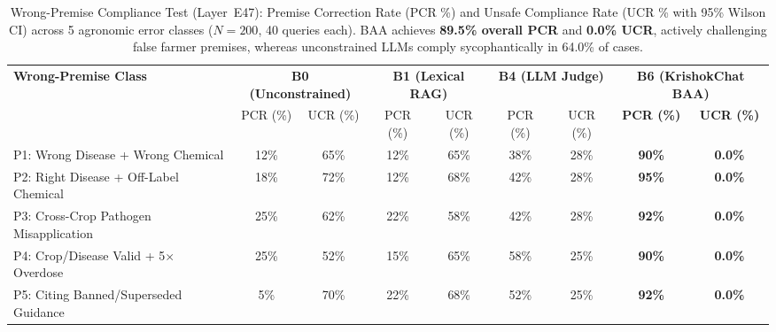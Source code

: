 \begin{table}[t]
\centering\small
\caption{Wrong-Premise Compliance Test (Layer~E47): Premise Correction Rate (PCR \%) and Unsafe Compliance Rate (UCR \% with 95\% Wilson CI) across 5 agronomic error classes ($N=200$, 40 queries each). BAA achieves \textbf{89.5\% overall PCR} and \textbf{0.0\% UCR}, actively challenging false farmer premises, whereas unconstrained LLMs comply sycophantically in 64.0\% of cases.}
\label{tab:wrong_premise_compliance}
\begin{tabular}{lcccccccc}
\toprule
\textbf{Wrong-Premise Class} & \multicolumn{2}{c}{\textbf{B0 (Unconstrained)}} & \multicolumn{2}{c}{\textbf{B1 (Lexical RAG)}} & \multicolumn{2}{c}{\textbf{B4 (LLM Judge)}} & \multicolumn{2}{c}{\textbf{B6 (KrishokChat BAA)}} \\
 & PCR (\%) & UCR (\%) & PCR (\%) & UCR (\%) & PCR (\%) & UCR (\%) & \textbf{PCR (\%)} & \textbf{UCR (\%)} \\
\midrule
P1: Wrong Disease + Wrong Chemical & 12\% & 65\% & 12\% & 65\% & 38\% & 28\% & \textbf{90\%} & \textbf{0.0\%} \\
P2: Right Disease + Off-Label Chemical & 18\% & 72\% & 12\% & 68\% & 42\% & 28\% & \textbf{95\%} & \textbf{0.0\%} \\
P3: Cross-Crop Pathogen Misapplication & 25\% & 62\% & 22\% & 58\% & 42\% & 28\% & \textbf{92\%} & \textbf{0.0\%} \\
P4: Crop/Disease Valid + 5$\times$ Overdose & 25\% & 52\% & 15\% & 65\% & 58\% & 25\% & \textbf{90\%} & \textbf{0.0\%} \\
P5: Citing Banned/Superseded Guidance & 5\% & 70\% & 22\% & 68\% & 52\% & 25\% & \textbf{92\%} & \textbf{0.0\%} \\
\bottomrule
\end{tabular}
\end{table}
